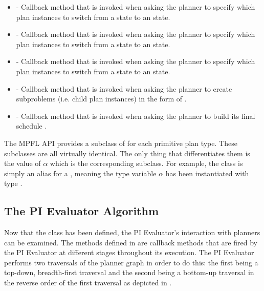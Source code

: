 \begin{itemize}
\item {} - Callback method that is invoked when asking the planner to specify which plan instances to switch from a  state to an  state.
\item {} - Callback method that is invoked when asking the planner to specify which plan instances to switch from a  state to an  state.
\item {} - Callback method that is invoked when asking the planner to specify which plan instances to switch from a  state to an  state.
\item {} - Callback method that is invoked when asking the planner to create subproblems (i.e. child plan instances) in the form of .
\item {} - Callback method that is invoked when asking the planner to build its final schedule .
\end{itemize}

The MPFL API provides a subclass of  for each primitive plan type. These subclasses are all virtually identical. The only thing that differentiates them is the value of $\alpha$ which is the corresponding  subclass. For example, the class  is simply an alias for a , meaning the type variable $\alpha$ has been instantiated with type .

\subsection{The PI Evaluator Algorithm}
Now that the class  has been defined, the PI Evaluator's interaction with planners can be examined. The methods defined in  are callback methods that are fired by the PI Evaluator at different stages throughout its execution. The PI Evaluator performs two traversals of the planner graph in order to do this: the first being a top-down, breadth-first traversal and the second being a bottom-up traversal in the reverse order of the first traversal as depicted in .

